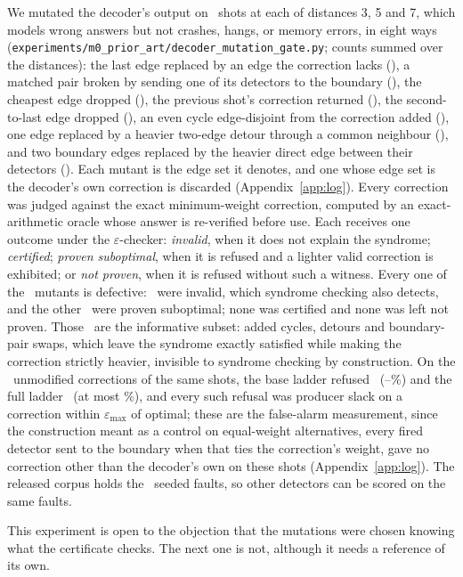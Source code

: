 \documentclass[aps,pra,twocolumn,superscriptaddress,nofootinbib,longbibliography,floatfix]{revtex4-2}
\newcommand{\eps}{\varepsilon}
\begin{document}
We mutated the decoder's output on \DetShotsPerDistance\ shots at each of distances 3, 5 and 7, which models wrong answers but not crashes, hangs, or memory errors, in eight ways (\nolinkurl{experiments/m0_prior_art/decoder_mutation_gate.py}; counts summed over the distances): the last edge replaced by an edge the correction lacks (\DetMutOne), a matched pair broken by sending one of its detectors to the boundary (\DetMutTwo), the cheapest edge dropped (\DetMutThree), the previous shot's correction returned (\DetMutFour), the second-to-last edge dropped (\DetMutSix), an even cycle edge-disjoint from the correction added (\DetMutSeven), one edge replaced by a heavier two-edge detour through a common neighbour (\DetMutNine), and two boundary edges replaced by the heavier direct edge between their detectors (\DetMutEight). Each mutant is the edge set it denotes, and one whose edge set is the decoder's own correction is discarded (Appendix~\ref{app:log}). Every correction was judged against the exact minimum-weight correction, computed by an exact-arithmetic oracle whose answer is re-verified before use. Each receives one outcome under the $\eps$-checker: \emph{invalid}, when it does not explain the syndrome; \emph{certified}; \emph{proven suboptimal}, when it is refused and a lighter valid correction is exhibited; or \emph{not proven}, when it is refused without such a witness. Every one of the \DetDefectN\ mutants is defective: \DetDefectInvalid\ were invalid, which syndrome checking also detects, and the other \DetDefectProven\ were proven suboptimal; none was certified and none was left not proven. Those \DetStealthN\ are the informative subset: added cycles, detours and boundary-pair swaps, which leave the syndrome exactly satisfied while making the correction strictly heavier, invisible to syndrome checking by construction. On the \DetCleanN\ unmodified corrections of the same shots, the base ladder refused \DetCleanFalseAlarms\ (\CIFaBaseLo--\CIFaBaseHi\%) and the full ladder \DetCleanFalseAlarmsFull\ (at most \CIFaFullHi\%), and every such refusal was producer slack on a correction within $\eps_{\max}$ of optimal; these are the false-alarm measurement, since the construction meant as a control on equal-weight alternatives, every fired detector sent to the boundary when that ties the correction's weight, gave no correction other than the decoder's own on these shots (Appendix~\ref{app:log}). The released corpus holds the \FaultCorpus\ seeded faults, so other detectors can be scored on the same faults.

This experiment is open to the objection that the mutations were chosen knowing what the certificate checks. The next one is not, although it needs a reference of its own.
\end{document}
